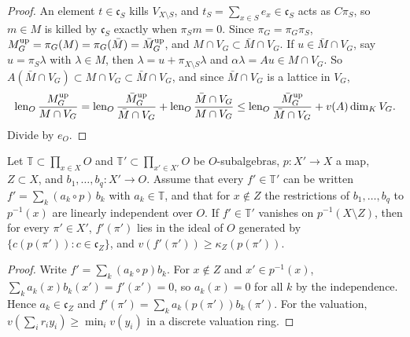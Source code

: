 \begin{proof}
An element $t\in\mathfrak c_S$ kills $V_{X\setminus S}$, and $t_S=\sum_{x\in S}e_x\in\mathfrak c_S$ acts as $C\pi_S$, so $m\in M$ is killed by $\mathfrak c_S$ exactly when $\pi_Sm=0$. Since $\pi_G=\pi_G\pi_S$, $M^{\rm up}_G=\pi_G(M)=\pi_G(\bar M)=\bar M^{\rm up}_G$, and $M\cap V_G\subset\bar M\cap V_G$. If $u\in\bar M\cap V_G$, say $u=\pi_S\lambda$ with $\lambda\in M$, then $\lambda=u+\pi_{X\setminus S}\lambda$ and $\alpha\lambda=Au\in M\cap V_G$. So $A(\bar M\cap V_G)\subset M\cap V_G\subset\bar M\cap V_G$, and since $\bar M\cap V_G$ is a lattice in $V_G$,
\[
\operatorname{len}_O\frac{M^{\rm up}_G}{M\cap V_G}=\operatorname{len}_O\frac{\bar M^{\rm up}_G}{\bar M\cap V_G}+\operatorname{len}_O\frac{\bar M\cap V_G}{M\cap V_G}\le\operatorname{len}_O\frac{\bar M^{\rm up}_G}{\bar M\cap V_G}+v(A)\dim_KV_G .
\]
Divide by $e_O$.
\end{proof}

\begin{lemma}\label{lk:lem:descent}
Let $\mathbb T\subset\prod_{x\in X}O$ and $\mathbb T'\subset\prod_{x'\in X'}O$ be $O$-subalgebras, $p\colon X'\to X$ a map, $Z\subset X$, and $b_1,\dots,b_q\colon X'\to O$. Assume that every $f'\in\mathbb T'$ can be written $f'=\sum_k(a_k\circ p)\,b_k$ with $a_k\in\mathbb T$, and that for $x\notin Z$ the restrictions of $b_1,\dots,b_q$ to $p^{-1}(x)$ are linearly independent over $O$. If $f'\in\mathbb T'$ vanishes on $p^{-1}(X\setminus Z)$, then for every $\pi'\in X'$, $f'(\pi')$ lies in the ideal of $O$ generated by $\{c(p(\pi')):c\in\mathfrak c_Z\}$, and $v(f'(\pi'))\ge\kappa_Z(p(\pi'))$.
\end{lemma}

\begin{proof}
Write $f'=\sum_k(a_k\circ p)b_k$. For $x\notin Z$ and $x'\in p^{-1}(x)$, $\sum_ka_k(x)b_k(x')=f'(x')=0$, so $a_k(x)=0$ for all $k$ by the independence. Hence $a_k\in\mathfrak c_Z$ and $f'(\pi')=\sum_ka_k(p(\pi'))b_k(\pi')$. For the valuation, $v(\sum_ir_iy_i)\ge\min_iv(y_i)$ in a discrete valuation ring.
\end{proof}

